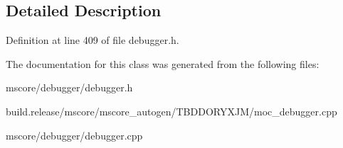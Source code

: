 \subsection{Detailed Description}


Definition at line 409 of file debugger.\+h.



The documentation for this class was generated from the following files\+:\begin{DoxyCompactItemize}
\item 
mscore/debugger/debugger.\+h\item 
build.\+release/mscore/mscore\+\_\+autogen/\+T\+B\+D\+D\+O\+R\+Y\+X\+J\+M/moc\+\_\+debugger.\+cpp\item 
mscore/debugger/debugger.\+cpp\end{DoxyCompactItemize}
